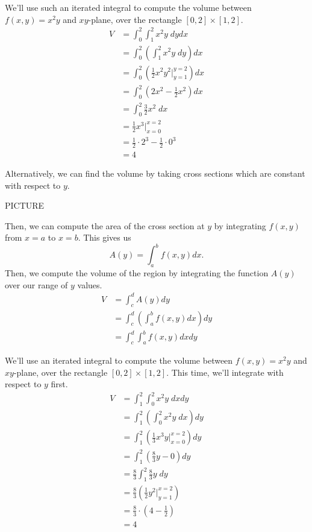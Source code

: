 \documentclass{ximera}
\begin{document}
\begin{example}
We'll use such an iterated integral to compute the volume between $f(x,y) = x^2y$ and $xy$-plane, over the rectangle $[0,2]\times [1,2]$.
\begin{align*}
V &=\int_0^2\int_1^2 x^2y\;dydx\\
&=  \int_0^2\left(\int_1^2 x^2y\;dy\right)dx\\
&= \int_0^2\left(\frac{1}{2}x^2y^2|_{y=1}^{y=2}\right)dx\\
&= \int_0^2\left(2x^2 - \frac{1}{2}x^2\right)dx\\
&= \int_0^2\frac{3}{2}x^2\;dx\\
&= \frac{1}{2}x^3|_{x=0}^{x=2}\\
&= \frac{1}{2}\cdot 2^3 - \frac{1}{2}\cdot 0^3\\
&= 4
\end{align*}
\end{example}

Alternatively, we can find the volume by taking cross sections which are constant with respect to $y$.

PICTURE

Then, we can compute the area of the cross section at $y$ by integrating $f(x,y)$ from $x=a$ to $x=b$. This gives us
\[
A(y) = \int_a^b f(x,y)dx.
\]
Then, we compute the volume of the region by integrating the function $A(y)$ over our range of $y$ values.
\begin{align*}
V &= \int_c^d A(y)dy\\
&= \int_c^d\left(\int_a^b f(x,y)dx\right)dy\\
&= \int_c^d\int_a^b f(x,y)dxdy
\end{align*}

\begin{example}
We'll use an iterated integral to compute the volume between $f(x,y) = x^2y$ and $xy$-plane, over the rectangle $[0,2]\times [1,2]$. This time, we'll integrate with respect to $y$ first.
\begin{align*}
V &=\int_1^2\int_0^2 x^2y\;dxdy\\
&=  \int_1^2\left(\int_0^2 x^2y\;dx\right)dy\\
&= \int_1^2\left(\frac{1}{3}x^3y|_{x=0}^{x=2}\right)dy\\
&= \int_1^2\left(\frac{8}{3}y - 0\right)dy\\
&= \frac{8}{3}\int_1^2\frac{8}{3}y\;dy\\
&= \frac{8}{3}\left(\frac{1}{2}y^2|_{y=1}^{x=2}\right)\\
&= \frac{8}{3}\cdot\left(4 - \frac{1}{2}\right)\\
&= 4
\end{align*}
\end{example}
\end{document}
